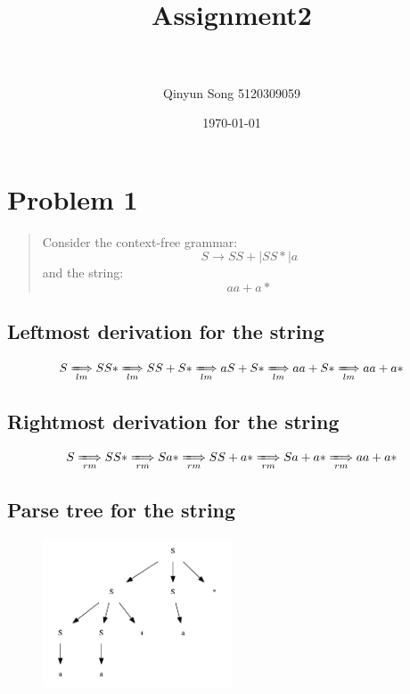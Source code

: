 \documentclass[paper=a4, fontsize=11pt]{scrartcl} %
\title{	
\normalfont \normalsize 
\horrule{0.5pt} \\[0.4cm] %
\huge Assignment2 \\ %
\horrule{2pt} \\[0.5cm] %
}
\author{Qinyun Song 5120309059} %
\date{\normalsize\today} %
\numberwithin{equation}{section} %
\numberwithin{figure}{section} %
\numberwithin{table}{section} %
\begin{document}
\maketitle %

\newpage
\section*{Problem 1}
	\begin{quote}
		Consider the context-free grammar:
		\begin{displaymath}
			S \to SS+ | SS* | a
		\end{displaymath}
		and the string:
		\begin{displaymath}
			aa+a*
		\end{displaymath}
	\end{quote}
\subsection*{Leftmost derivation for the string}
	\begin{displaymath}
		S \xLongrightarrow[lm]{} SS* \xLongrightarrow[lm]{} SS+S* \xLongrightarrow[lm]{} aS+S* \xLongrightarrow[lm]{} aa+S* \xLongrightarrow[lm]{} aa+a*
	\end{displaymath}
\subsection*{Rightmost derivation for the string}
	\begin{displaymath}
		S \xLongrightarrow[rm]{} SS* \xLongrightarrow[rm]{} Sa* \xLongrightarrow[rm]{} SS+a* \xLongrightarrow[rm]{} Sa+a* \xLongrightarrow[rm]{} aa+a*
	\end{displaymath}
\subsection*{Parse tree for the string}
	\begin{figure}[H]
	\centering
	\includegraphics[width=0.5\textwidth]{parseTree.png}
	\end{figure}
	
\end{document}
